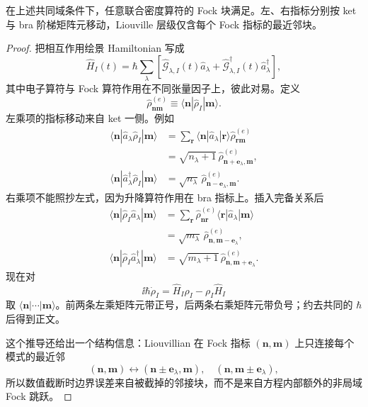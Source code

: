 \begin{proposition}[线性玻色耦合的密度块邻接层级]
在上述共同域条件下，任意联合密度算符的 Fock 块满足。左、右指标分别按 ket 与 bra 阶梯矩阵元移动，Liouville 层级仅含每个 Fock 指标的最近邻块。
\end{proposition}
\begin{proof}
把相互作用绘景 Hamiltonian 写成
\[
\hat H_I(t)
=\hbar\sum_\lambda
\left[
\hat{\mathcal G}_{\lambda,I}(t)\hat a_\lambda
+\hat{\mathcal G}_{\lambda,I}^\dagger(t)\hat a_\lambda^\dagger
\right],
\]
其中电子算符与 Fock 算符作用在不同张量因子上，彼此对易。定义
\[
\hat\rho^{(e)}_{\mathbf n\mathbf m}
\equiv\langle\mathbf n|\hat\rho_I|\mathbf m\rangle.
\]
左乘项的指标移动来自 ket 一侧。例如
\begin{align*}
\langle\mathbf n|\hat a_\lambda\hat\rho_I|\mathbf m\rangle
&=\sum_{\mathbf r}
\langle\mathbf n|\hat a_\lambda|\mathbf r\rangle
\hat\rho^{(e)}_{\mathbf r\mathbf m}\\
&=\sqrt{n_\lambda+1}\,
\hat\rho^{(e)}_{\mathbf n+\mathbf e_\lambda,\mathbf m},\\
\langle\mathbf n|\hat a_\lambda^\dagger\hat\rho_I|\mathbf m\rangle
&=\sqrt{n_\lambda}\,
\hat\rho^{(e)}_{\mathbf n-\mathbf e_\lambda,\mathbf m}.
\end{align*}
右乘项不能照抄左式，因为升降算符作用在 bra 指标上。插入完备关系后
\begin{align*}
\langle\mathbf n|\hat\rho_I\hat a_\lambda|\mathbf m\rangle
&=\sum_{\mathbf r}
\hat\rho^{(e)}_{\mathbf n\mathbf r}
\langle\mathbf r|\hat a_\lambda|\mathbf m\rangle\\
&=\sqrt{m_\lambda}\,
\hat\rho^{(e)}_{\mathbf n,\mathbf m-\mathbf e_\lambda},\\
\langle\mathbf n|\hat\rho_I\hat a_\lambda^\dagger|\mathbf m\rangle
&=\sqrt{m_\lambda+1}\,
\hat\rho^{(e)}_{\mathbf n,\mathbf m+\mathbf e_\lambda}.
\end{align*}
现在对
\[
\ii\hbar\dot\rho_I=\hat H_I\rho_I-\rho_I\hat H_I
\]
取 $\langle\mathbf n|\cdots|\mathbf m\rangle$。前两条左乘矩阵元带正号，后两条右乘矩阵元带负号；约去共同的 $\hbar$ 后得到正文。

这个推导还给出一个结构信息：Liouvillian 在 Fock 指标 $(\mathbf n,\mathbf m)$ 上只连接每个模式的最近邻
\[
(\mathbf n,\mathbf m)
\longleftrightarrow
(\mathbf n\pm\mathbf e_\lambda,\mathbf m),
\quad
(\mathbf n,\mathbf m\pm\mathbf e_\lambda),
\]
所以数值截断时边界误差来自被截掉的邻接块，而不是来自方程内部额外的非局域 Fock 跳跃。
\end{proof}


